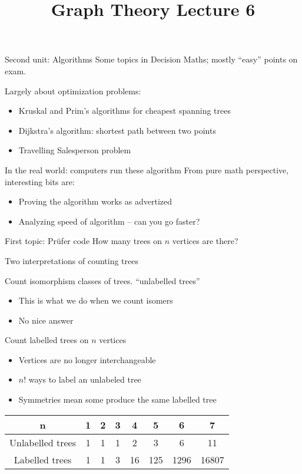 \documentclass{beamer}
\title{Graph Theory Lecture 6}
\begin{document}
\begin{frame}{Second unit: Algorithms}
Some topics in Decision Maths; mostly ``easy'' points on exam.
  \begin{block}{Largely about optimization problems:}
    \begin{itemize}
    \item Kruskal and Prim's algorithms for cheapest spanning trees
    \item Dijkstra's algorithm: shortest path between two points
    \item Travelling Salesperson problem
    \end{itemize}
    \end{block}
  \begin{block}{In the real world: computers run these algorithm}
    From pure math perspective, interesting bits are:
    \begin{itemize}
    \item Proving the algorithm works as advertized
    \item Analyzing speed of algorithm -- can you go faster?
      \end{itemize}
    \end{block}


 \begin{block}{First topic: Pr\"ufer code}
    How many trees on $n$ vertices are there?
    \end{block}
\end{frame}

\begin{frame}{Two interpretations of counting trees}
\begin{block}{Count isomorphism classes of trees. ``unlabelled trees''}
\begin{itemize}
\item  This is what we do when we count isomers
\item No nice answer
\end{itemize}

\end{block}
\begin{block}{Count labelled trees on $n$ vertices}
\begin{itemize}
\item  Vertices are no longer interchangeable
\item $n!$ ways to label an unlabeled tree
  \item Symmetries mean some produce the same labelled tree
\end{itemize}
\end{block}
\begin{center}
\begin{tabular}{c|c|c|c|c|c|c|c}
n &  1 & 2 & 3 & 4 & 5 & 6 & 7 \\ \hline
Unlabelled trees &  1 & 1 & 1 & 2 & 3 & 6 & 11 \\ \hline
Labelled trees & 1 & 1 & 3 & 16 & 125 & 1296 & 16807
  \end{tabular}
\end{center}


\end{frame}
\end{document}
